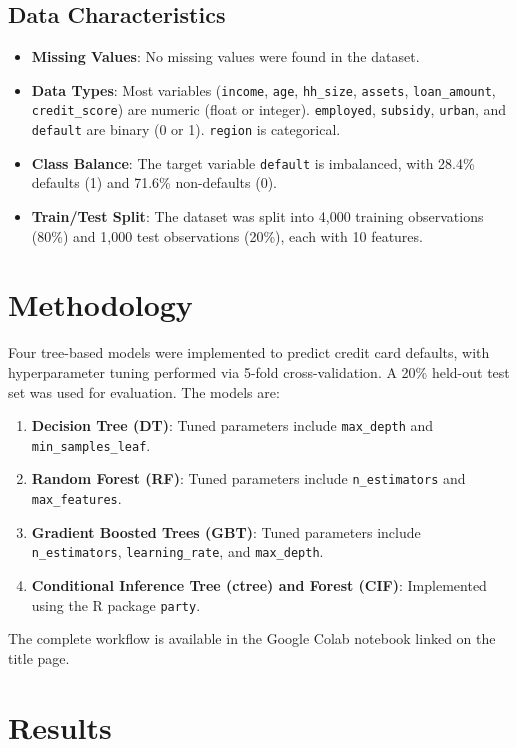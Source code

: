 \documentclass[a4paper,12pt,headsepline]{scrartcl} %
\begin{document}
\subsection{Data Characteristics}
\begin{itemize}
    \item \textbf{Missing Values}: No missing values were found in the dataset.
    \item \textbf{Data Types}: Most variables (\texttt{income}, \texttt{age}, \texttt{hh\_size}, \texttt{assets}, \texttt{loan\_amount}, \texttt{credit\_score}) are numeric (float or integer). \texttt{employed}, \texttt{subsidy}, \texttt{urban}, and \texttt{default} are binary (0 or 1). \texttt{region} is categorical.
    \item \textbf{Class Balance}: The target variable \texttt{default} is imbalanced, with 28.4\% defaults (1) and 71.6\% non-defaults (0).
    \item \textbf{Train/Test Split}: The dataset was split into 4,000 training observations (80\%) and 1,000 test observations (20\%), each with 10 features.
\end{itemize}

\section{Methodology}
Four tree-based models were implemented to predict credit card defaults, with hyperparameter tuning performed via 5-fold cross-validation. A 20\% held-out test set was used for evaluation. The models are:
\begin{enumerate}
    \item \textbf{Decision Tree (DT)}: Tuned parameters include \texttt{max\_depth} and \texttt{min\_samples\_leaf}.
    \item \textbf{Random Forest (RF)}: Tuned parameters include \texttt{n\_estimators} and \texttt{max\_features}.
    \item \textbf{Gradient Boosted Trees (GBT)}: Tuned parameters include \texttt{n\_estimators}, \texttt{learning\_rate}, and \texttt{max\_depth}.
    \item \textbf{Conditional Inference Tree (ctree) and Forest (CIF)}: Implemented using the R package \texttt{party}.
\end{enumerate}
The complete workflow is available in the Google Colab notebook linked on the title page.

\section{Results}
\end{document}
